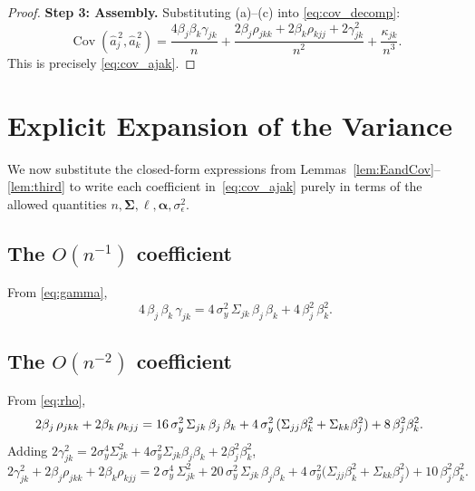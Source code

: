 \documentclass[11pt]{article}
\newcommand{\Cov}{\operatorname{Cov}}
\newcommand{\bSig}{\boldsymbol{\Sigma}}
\newcommand{\balpha}{\boldsymbol{\alpha}}
\theoremstyle{plain}
\theoremstyle{definition}
\theoremstyle{remark}
\begin{document}
\begin{proof}
\noindent\textbf{Step 3: Assembly.}
Substituting (a)--(c) into \eqref{eq:cov_decomp}:
\[
    \Cov(\widehat{a}_j^{\,2},\widehat{a}_k^{\,2})
    = \frac{4\beta_j\beta_k\gamma_{jk}}{n}
    + \frac{2\beta_j\rho_{jkk}+2\beta_k\rho_{kjj}+2\gamma_{jk}^2}{n^2}
    + \frac{\kappa_{jk}}{n^3}.
\]
This is precisely \eqref{eq:cov_ajak}.
\end{proof}

\section{Explicit Expansion of the Variance}

We now substitute the closed-form expressions from
Lemmas~\ref{lem:EandCov}--\ref{lem:third} to write each
coefficient in~\eqref{eq:cov_ajak} purely in terms of the
allowed quantities $n,\bSig,\boldsymbol{\ell},\balpha,\sigma_\epsilon^2$.

\subsection{The $O(n^{-1})$ coefficient}
From \eqref{eq:gamma},
\begin{equation}\label{eq:order1coeff}
    4\,\beta_j\,\beta_k\,\gamma_{jk}
    = 4\,\sigma_y^2\,\Sigma_{jk}\,\beta_j\,\beta_k
      + 4\,\beta_j^2\,\beta_k^2.
\end{equation}

\subsection{The $O(n^{-2})$ coefficient}
From \eqref{eq:rho},
\begin{align}
    2\beta_j\,\rho_{jkk} + 2\beta_k\,\rho_{kjj}
    &= 16\,\sigma_y^2\,\Sigma_{jk}\,\beta_j\,\beta_k
       + 4\,\sigma_y^2\,(\Sigma_{jj}\beta_k^2 + \Sigma_{kk}\beta_j^2)
       + 8\,\beta_j^2\beta_k^2 . \notag
\end{align}
Adding $2\gamma_{jk}^2 = 2\sigma_y^4\Sigma_{jk}^2
+ 4\sigma_y^2\Sigma_{jk}\beta_j\beta_k + 2\beta_j^2\beta_k^2$,
\begin{equation}\label{eq:order2coeff}
    2\gamma_{jk}^2 + 2\beta_j\rho_{jkk} + 2\beta_k\rho_{kjj}
    = 2\,\sigma_y^4\,\Sigma_{jk}^2
      + 20\,\sigma_y^2\,\Sigma_{jk}\,\beta_j\beta_k
      + 4\,\sigma_y^2\bigl(\Sigma_{jj}\beta_k^2+\Sigma_{kk}\beta_j^2\bigr)
      + 10\,\beta_j^2\beta_k^2.
\end{equation}
\end{document}
